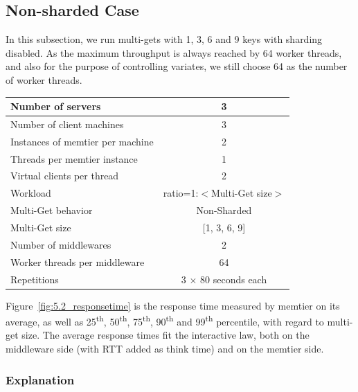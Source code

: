 \subsection{Non-sharded Case}

In this subsection, we run multi-gets with 1, 3, 6 and 9 keys with sharding disabled. As the maximum throughput is always reached by 64 worker threads, and also for the purpose of controlling variates, we still choose 64 as the number of worker threads.

\begin{center}
	\scriptsize{
		\begin{tabular}{|l|c|}
			\hline Number of servers                & 3                       \\ 
			\hline Number of client machines        & 3                       \\ 
			\hline Instances of memtier per machine & 2                       \\ 
			\hline Threads per memtier instance     & 1                       \\
			\hline Virtual clients per thread       & 2                		 \\ 
			\hline Workload                         & ratio=1:$<$Multi-Get size$>$              \\
			\hline Multi-Get behavior               & Non-Sharded             \\
			\hline Multi-Get size                   & [1, 3, 6, 9]                  \\
			\hline Number of middlewares            & 2                       \\
			\hline Worker threads per middleware    & 64 \\
			\hline Repetitions                      & 3 $\times$ 80 seconds each      \\ 
			\hline 
		\end{tabular}
	} 
\end{center}
Figure~\ref{fig:5.2_responsetime} is the response time measured by memtier on its average, as well as 25\textsuperscript{th}, 50\textsuperscript{th}, 75\textsuperscript{th}, 90\textsuperscript{th} and 99\textsuperscript{th} percentile, with regard to multi-get size. The average response times fit the interactive law, both on the middleware side (with RTT added as think time) and on the memtier side.

\subsubsection{Explanation}

